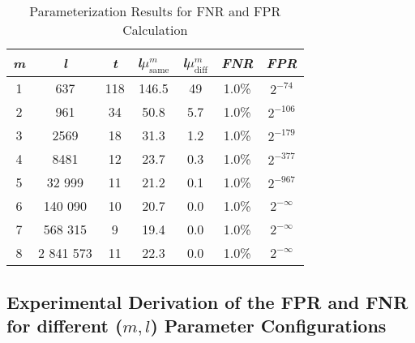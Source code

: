 \begin{table}[htbp] 
    \centering
    \begin{tabular}{|c|c|c|c|c|c|c|}
        \hline
        \textit{m} & \textit{l} & \textit{t} & \textit{l}\(\mu_{\text{same}}^m\) & \textit{l}\(\mu_{\text{diff}}^m\) & \textit{FNR} & \textit{FPR} \\
        \hline
        1 & 637 & 118 & 146.5 & 49 & 1.0\% & \(2^{-74}\) \\
        2 & 961 & 34 & 50.8 & 5.7 & 1.0\% & \(2^{-106}\) \\
        3 & 2569 & 18 & 31.3 & 1.2 & 1.0\% &\(2^{-179}\) \\
        4 & 8481 & 12 & 23.7 & 0.3 & 1.0\% & \(2^{-377}\) \\
        5 & 32 999 & 11 & 21.2 & 0.1 & 1.0\% & \(2^{-967}\) \\
        6 & 140 090 & 10 & 20.7 & 0.0 & 1.0\% & \(2^{-\infty}\) \\
        7 & 568 315 & 9 & 19.4 & 0.0 & 1.0\% & \(2^{-\infty}\) \\
        8 & 2 841 573 & 11 & 22.3 & 0.0 & 1.0\% & \(2^{-\infty}\) \\
        \hline
    \end{tabular}
    \caption{Parameterization Results for FNR and FPR Calculation}
    \label{tab:parameterization}
\end{table}

\subsection{Experimental Derivation of the FPR and FNR for different (\(m, l\)) Parameter Configurations}

